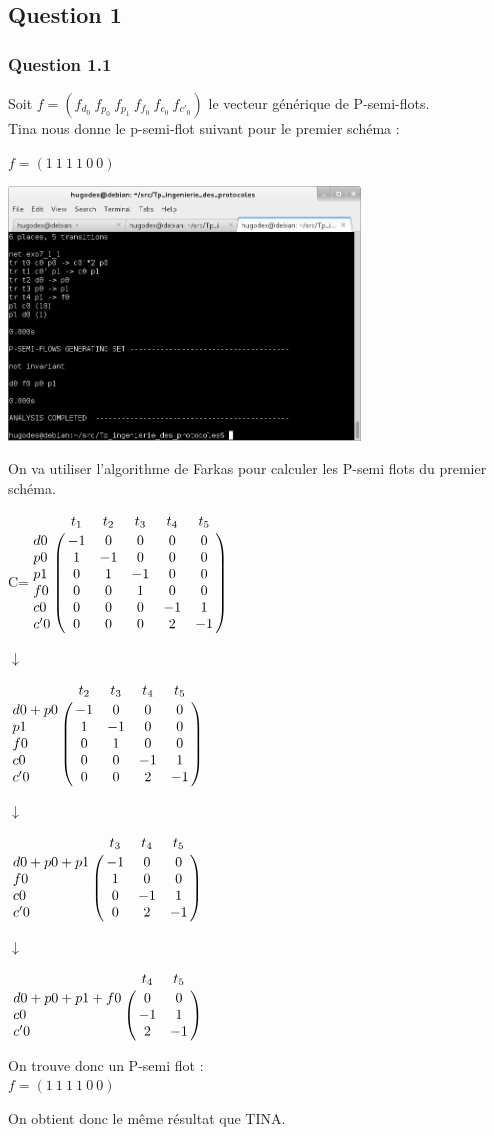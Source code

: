 \subsection{Question 1}
\subsubsection{Question 1.1}

Soit $f=(f_{d_0}\ f_{p_0}\ f_{p_1}\ f_{f_0}\ f_{c_0}\ f_{c'_0})$ le vecteur générique de P-semi-flots.\\
Tina nous donne le p-semi-flot suivant pour le premier schéma :\\
\begin{center}
  $f= (1\ 1\ 1\ 1\ 0\ 0)$

\includegraphics[width=0.7\textwidth]{exo7/tina_7_1.png}\\

\end{center}

\newpage

On va utiliser l'algorithme de Farkas pour calculer les P-semi flots du premier schéma.

\begin{center}

{\Huge C}\qquad =\qquad $\bordermatrix{
&t_1&t_2&t_3&t_4&t_5\cr
d0&-1&0&0&0&0\cr
p0&1&-1&0&0&0\cr
p1&0&1&-1&0&0\cr
f0&0&0&1&0&0\cr
c0&0&0&0&-1&1\cr
c'0&0&0&0&2&-1\cr
}$

{\Huge $\downarrow$}

$\bordermatrix{
&t_2&t_3&t_4&t_5\cr
d0+p0&-1&0&0&0\cr
p1&1&-1&0&0\cr
f0&0&1&0&0\cr
c0&0&0&-1&1\cr
c'0&0&0&2&-1\cr
}$

{\Huge $\downarrow$}

$\bordermatrix{
&t_3&t_4&t_5\cr
d0+p0+p1&-1&0&0\cr
f0&1&0&0\cr
c0&0&-1&1\cr
c'0&0&2&-1\cr
}$

{\Huge $\downarrow$}

$\bordermatrix{
&t_4&t_5\cr
d0+p0+p1+f0&0&0\cr
c0&-1&1\cr
c'0&2&-1\cr
}$


\vspace{1cm}

On trouve donc un P-semi flot :\\
$f = (1\ 1\ 1\ 1\ 0\ 0)$

On obtient donc le même résultat que TINA.

\end{center}


